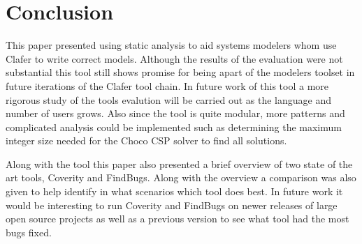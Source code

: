 \documentclass[10pt,oneside]{IEEEtran}
\begin{document}
\section{Conclusion}
This paper presented using static analysis to aid systems modelers whom use Clafer to write correct models. Although the results of the evaluation were not substantial this tool still shows promise for being apart of the modelers toolset in future iterations of the Clafer tool chain. In future work of this tool a more rigorous study of the tools evalution will be carried out as the language and number of users grows. Also since the tool is quite modular, more patterns and complicated analysis could be implemented such as determining the maximum integer size needed for the Choco CSP solver to find all solutions.

Along with the tool this paper also presented a brief overview of two state of the art tools, Coverity and FindBugs. Along with the overview a comparison was also given to help identify in what scenarios which tool does best. In future work it would be interesting to run Coverity and FindBugs on newer releases of large open source projects as well as a previous version to see what tool had the most bugs fixed.

\printbibliography
\end{document}
